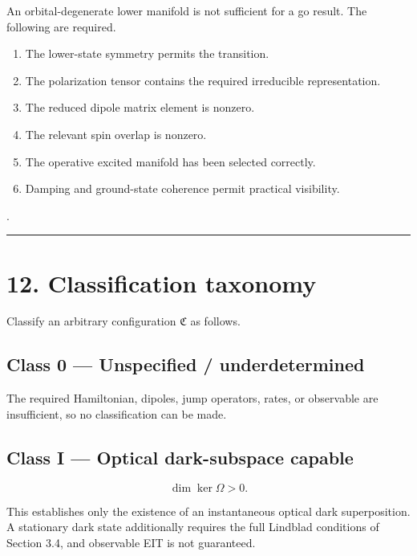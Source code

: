 \documentclass[
  10pt,
  a4paper,
]{article}
\providecommand{\tightlist}{%
  \setlength{\itemsep}{0pt}\setlength{\parskip}{0pt}}
\begin{document}
An orbital-degenerate lower manifold is not sufficient for a go result.
The following are required.

\begin{enumerate}
\def\labelenumi{\arabic{enumi}.}
\tightlist
\item
  The lower-state symmetry permits the transition.
\item
  The polarization tensor contains the required irreducible
  representation.
\item
  The reduced dipole matrix element is nonzero.
\item
  The relevant spin overlap is nonzero.
\item
  The operative excited manifold has been selected correctly.
\item
  Damping and ground-state coherence permit practical visibility.
\end{enumerate}

.

\begin{center}\rule{0.5\linewidth}{0.5pt}\end{center}

\section{12. Classification taxonomy}\label{classification-taxonomy}

Classify an arbitrary configuration \(\mathfrak C\) as follows.

\subsection{Class 0 --- Unspecified /
underdetermined}\label{class-0-unspecified-underdetermined}

The required Hamiltonian, dipoles, jump operators, rates, or observable
are insufficient, so no classification can be made.

\subsection{Class I --- Optical dark-subspace
capable}\label{class-i-optical-dark-subspace-capable}

\[
\dim\ker\Omega>0.
\]

This establishes only the existence of an instantaneous optical dark
superposition. A stationary dark state additionally requires the full
Lindblad conditions of Section 3.4, and observable EIT is not
guaranteed.
\end{document}
